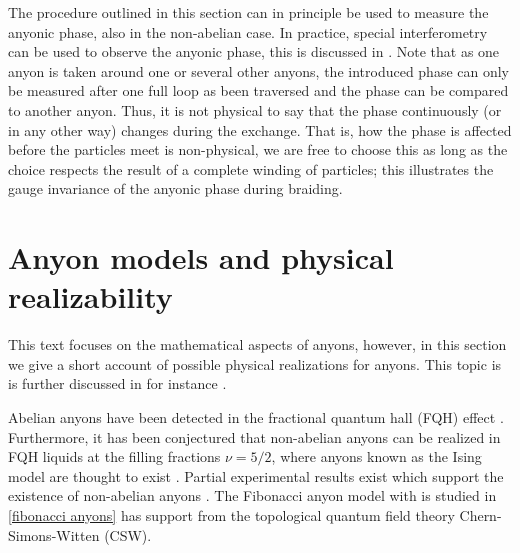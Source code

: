 \documentclass[a4paper,10pt,oneside]{book}
\theoremstyle{plain}
\theoremstyle{definition}
\theoremstyle{remark}
\begin{document}
The procedure outlined in this section can in principle be used to measure the anyonic phase, also in the non-abelian case. In practice, special interferometry can be used to observe the anyonic phase, this is discussed in \cite{bonderson}. Note that as one anyon is taken around one or several other anyons, the introduced phase can only be measured after one full loop as been traversed and the phase can be compared to another anyon. Thus, it is not physical to say that the phase continuously (or in any other way) changes during the exchange. That is, how the phase is affected before the particles meet is non-physical, we are free to choose this as long as the choice respects the result of a complete winding of particles; this illustrates the gauge invariance of the anyonic phase during braiding.













































\section{Anyon models and physical realizability}\label{sec:models and realizability}

This text focuses on the mathematical aspects of anyons, however, in this section we give a short account of possible physical realizations for anyons. This topic is is further discussed in for instance \cite{nayak,topological quantum compiling,slingerland bais}.

Abelian anyons have been detected in the fractional quantum hall (FQH) effect \cite{abelian fqh,fractional angular momentum}. Furthermore, it has been conjectured that non-abelian anyons can be realized in FQH liquids at the filling fractions $\nu = 5/2$, where anyons known as the Ising model are thought to exist \cite{wang book}. Partial experimental results exist which support the existence of non-abelian anyons \cite{non-abelian experimental}. The Fibonacci anyon model with is studied in \cref{fibonacci anyons} has support from the topological quantum field theory Chern-Simons-Witten (CSW).
\end{document}

